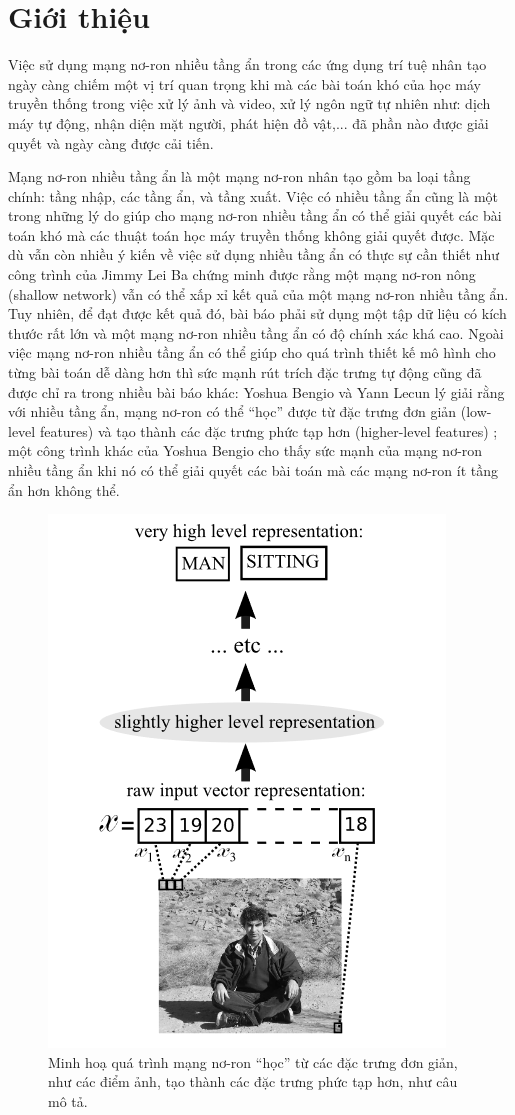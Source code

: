 \chapter{Giới thiệu}
\label{Chapter1}

Việc sử dụng mạng nơ-ron nhiều tầng ẩn trong các ứng dụng trí tuệ nhân tạo ngày càng chiếm một vị trí quan trọng khi mà các bài toán khó của học máy truyền thống trong việc xử lý ảnh và video, xử lý ngôn ngữ tự nhiên như: dịch máy tự động, nhận diện mặt người, phát hiện đồ vật,... đã phần nào được giải quyết và ngày càng được cải tiến.

Mạng nơ-ron nhiều tầng ẩn là một mạng nơ-ron nhân tạo gồm ba loại tầng chính: tầng nhập, các tầng ẩn, và tầng xuất. Việc có nhiều tầng ẩn cũng là một trong những lý do giúp cho mạng nơ-ron nhiều tầng ẩn có thể giải quyết các bài toán khó mà các thuật toán học máy truyền thống không giải quyết được. Mặc dù vẫn còn nhiều ý kiến về việc sử dụng nhiều tầng ẩn có thực sự cần thiết như công trình của Jimmy Lei Ba \cite{ba2013dodeepnets} chứng minh được rằng một mạng nơ-ron nông (shallow network) vẫn có thể xấp xỉ kết quả của một mạng nơ-ron nhiều tầng ẩn. Tuy nhiên, để đạt được kết quả đó, bài báo phải sử dụng một tập dữ liệu có kích thước rất lớn và một mạng nơ-ron nhiều tầng ẩn có độ chính xác khá cao. Ngoài việc mạng nơ-ron nhiều tầng ẩn có thể giúp cho quá trình thiết kế mô hình cho từng bài toán dễ dàng hơn \cite{nielsen2015neural} thì sức mạnh rút trích đặc trưng tự động cũng đã được chỉ ra trong nhiều bài báo khác: Yoshua Bengio và Yann Lecun lý giải rằng với nhiều tầng ẩn, mạng nơ-ron có thể ``học'' được từ đặc trưng đơn giản (low-level features) và tạo thành các đặc trưng phức tạp hơn (higher-level features) \cite{bengio2007scaling}; một công trình khác của Yoshua Bengio cho thấy sức mạnh của mạng nơ-ron nhiều tầng ẩn khi nó có thể giải quyết các bài toán mà các mạng nơ-ron ít tầng ẩn hơn không thể\cite{bengio2009learning}.

\begin{figure}[htp]
\centering
\includegraphics[width=65 mm]{images/layers-features.png}
\caption{Minh hoạ quá trình mạng nơ-ron ``học'' từ các đặc trưng đơn giản, như các điểm ảnh, tạo thành các đặc trưng phức tạp hơn, như câu mô tả. \cite{bengio2009learning}}
\label{fig:layers-features}
\end{figure}

